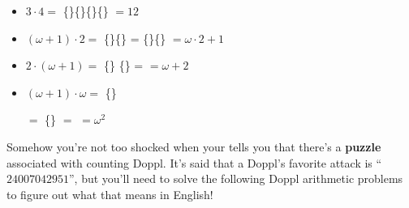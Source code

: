 \begin{itemize}
\item \(3\cdot 4=\)
\{\mappDoppl\mappDoppl\mappDoppl\}\{\mappDoppl\mappDoppl\mappDoppl\}\{\mappDoppl\mappDoppl\mappDoppl\}\{\mappDoppl\mappDoppl\mappDoppl\} \(=12\)

\item \((\omega+1)\cdot 2=\)
\{\mappDopplOmega\mappDoppl\}\{\mappDopplOmega\mappDoppl\} =
\{\mappDopplOmega\}\{\mappDoppl\mappDopplOmega\}\mappDoppl{} \(=\omega\cdot 2+1\)

\item \(2\cdot(\omega+1)=\)
\{\mappDoppl\mappDoppl\}%
\resizebox{0.4in}{!}{\{\mappDoppl\mappDoppl\}}%
\resizebox{0.3in}{!}{\{\mappDoppl\mappDoppl\}}%
\resizebox{0.2in}{!}{\{\mappDoppl\mappDoppl\}}%
\resizebox{0.1in}{!}{\{\mappDoppl\mappDoppl\}}%
\{\mappDoppl\mappDoppl\} =
\mappDopplOmega\mappDoppl\mappDoppl \(=\omega+2\)

\item \((\omega+1)\cdot \omega=\)
\{\mappDopplOmega\mappDoppl\}%
\resizebox{0.6in}{!}{\{\mappDopplOmega\mappDoppl\}}%
\resizebox{0.5in}{!}{\{\mappDopplOmega\mappDoppl\}}%
\resizebox{0.4in}{!}{\{\mappDopplOmega\mappDoppl\}}%
\resizebox{0.3in}{!}{\{\mappDopplOmega\mappDoppl\}}%
\resizebox{0.2in}{!}{\{\mappDopplOmega\mappDoppl\}}%
\resizebox{0.1in}{!}{\{\mappDopplOmega\mappDoppl\}}%

\hspace{0.7in}
\(=\)
\{\mappDopplOmega\}%
\resizebox{0.6in}{!}{\{\mappDoppl\mappDopplOmega\}}%
\resizebox{0.5in}{!}{\{\mappDoppl\mappDopplOmega\}}%
\resizebox{0.4in}{!}{\{\mappDoppl\mappDopplOmega\}}%
\resizebox{0.3in}{!}{\{\mappDoppl\mappDopplOmega\}}%
\resizebox{0.2in}{!}{\{\mappDoppl\mappDopplOmega\}}%
\resizebox{0.1in}{!}{\{\mappDoppl\mappDopplOmega\}}%
\(=\)
\mappDopplOmegaSquared \(=\omega^2\)
\end{itemize}


Somehow you're not too shocked when your \mappMobidex{} tells you that
there's a \textbf{puzzle} associated with counting Doppl. It's said
that a Doppl's favorite \mappMobimon{} attack is ``\(24007042951\)'',
but you'll need to solve the following Doppl arithmetic problems to
figure out what that means in English!


